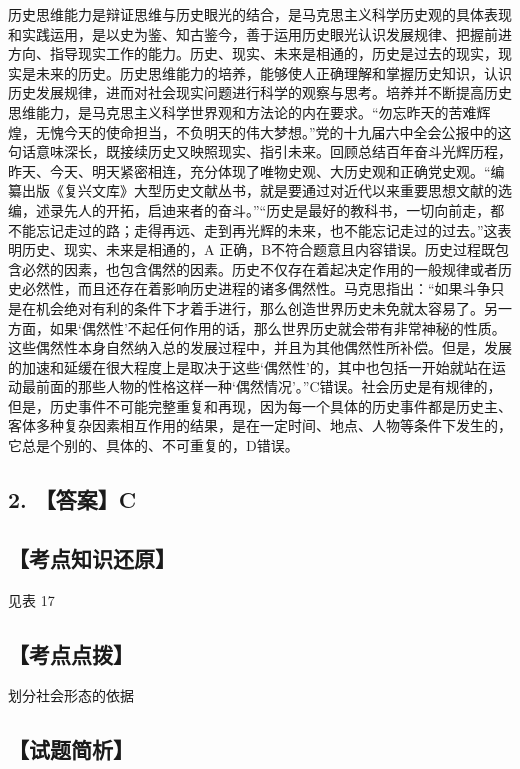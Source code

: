 \documentclass[UTF8,11pt]{ctexart}
\begin{document}
历史思维能力是辩证思维与历史眼光的结合，是马克思主义科学历史观的具体表现和实践运用，是以史为鉴、知古鉴今，善于运用历史眼光认识发展规律、把握前进方向、指导现实工作的能力。历史、现实、未来是相通的，历史是过去的现实，现实是未来的历史。历史思维能力的培养，能够使人正确理解和掌握历史知识，认识历史发展规律，进而对社会现实问题进行科学的观察与思考。培养并不断提高历史思维能力，是马克思主义科学世界观和方法论的内在要求。“勿忘昨天的苦难辉煌，无愧今天的使命担当，不负明天的伟大梦想。”党的十九届六中全会公报中的这句话意味深长，既接续历史又映照现实、指引未来。回顾总结百年奋斗光辉历程，昨天、今天、明天紧密相连，充分体现了唯物史观、大历史观和正确党史观。“编纂出版《复兴文库》大型历史文献丛书，就是要通过对近代以来重要思想文献的选编，述录先人的开拓，启迪来者的奋斗。”“历史是最好的教科书，一切向前走，都不能忘记走过的路；走得再远、走到再光辉的未来，也不能忘记走过的过去。”这表明历史、现实、未来是相通的，A 正确，B不符合题意且内容错误。历史过程既包含必然的因素，也包含偶然的因素。历史不仅存在着起决定作用的一般规律或者历史必然性，而且还存在着影响历史进程的诸多偶然性。马克思指出：“如果斗争只是在机会绝对有利的条件下才着手进行，那么创造世界历史未免就太容易了。另一方面，如果‘偶然性’不起任何作用的话，那么世界历史就会带有非常神秘的性质。这些偶然性本身自然纳入总的发展过程中，并且为其他偶然性所补偿。但是，发展的加速和延缓在很大程度上是取决于这些‘偶然性’的，其中也包括一开始就站在运动最前面的那些人物的性格这样一种‘偶然情况’。”C错误。社会历史是有规律的，但是，历史事件不可能完整重复和再现，因为每一个具体的历史事件都是历史主、客体多种复杂因素相互作用的结果，是在一定时间、地点、人物等条件下发生的，它总是个别的、具体的、不可重复的，D错误。


\subsection*{2. 【答案】C}

\subsection*{【考点知识还原】}

见表 17


\subsection*{【考点点拨】}

划分社会形态的依据


\subsection*{【试题简析】}
\end{document}
